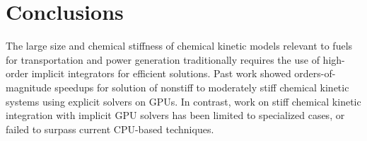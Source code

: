 \documentclass[final,twocolumn]{elsarticle}
\begin{document}
%
%

\section{Conclusions}
\ifmeasure
\addvspace{10pt}
\fi

The large size and chemical stiffness of chemical kinetic models relevant to fuels for transportation and power generation traditionally requires the use of high-order implicit integrators for efficient solutions.
Past work showed orders-of-magnitude speedups for solution of nonstiff to moderately stiff chemical kinetic systems using explicit solvers on GPUs.
In contrast, work on stiff chemical kinetic integration with implicit GPU solvers has been limited to specialized cases, or failed to surpass current CPU-based techniques.
\end{document}
